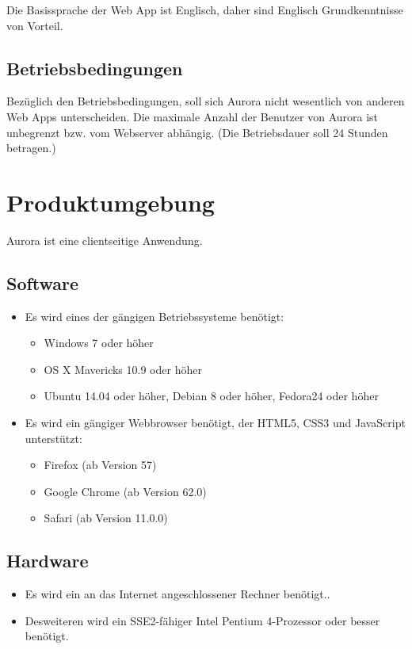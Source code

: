 \documentclass[parskip=full,11pt,twoside]{scrartcl}
\begin{document}
Die Basissprache der Web App ist Englisch, daher sind Englisch Grundkenntnisse von Vorteil.

\subsection{Betriebsbedingungen}
Bezüglich den Betriebsbedingungen, soll sich Aurora nicht wesentlich von anderen Web Apps unterscheiden. Die maximale Anzahl der Benutzer von Aurora ist unbegrenzt bzw. vom Webserver abhängig. (Die Betriebsdauer soll 24 Stunden betragen.)


\newpage
\section{Produktumgebung}
Aurora ist eine clientseitige Anwendung.

\subsection{Software}
	\begin{itemize}
		\item Es wird eines der gängigen Betriebssysteme benötigt:
		\begin{itemize}
			\item Windows 7 oder höher
			\item OS X Mavericks 10.9 oder höher
			\item Ubuntu 14.04 oder höher, Debian 8 oder höher, Fedora24 oder höher
		\end{itemize}
		\item Es wird ein gängiger Webbrowser benötigt, der HTML5, CSS3 und JavaScript unterstützt:
			\begin{itemize}
				\item Firefox (ab Version 57)
				\item Google Chrome (ab Version 62.0)
				\item Safari (ab Version 11.0.0)
			\end{itemize}
	\end{itemize}

\subsection{Hardware}
	\begin{itemize}
		\item Es wird ein an das Internet angeschlossener Rechner benötigt..
		\item Desweiteren wird ein SSE2-fähiger Intel Pentium 4-Prozessor oder besser benötigt.
	\end{itemize}
\end{document}
